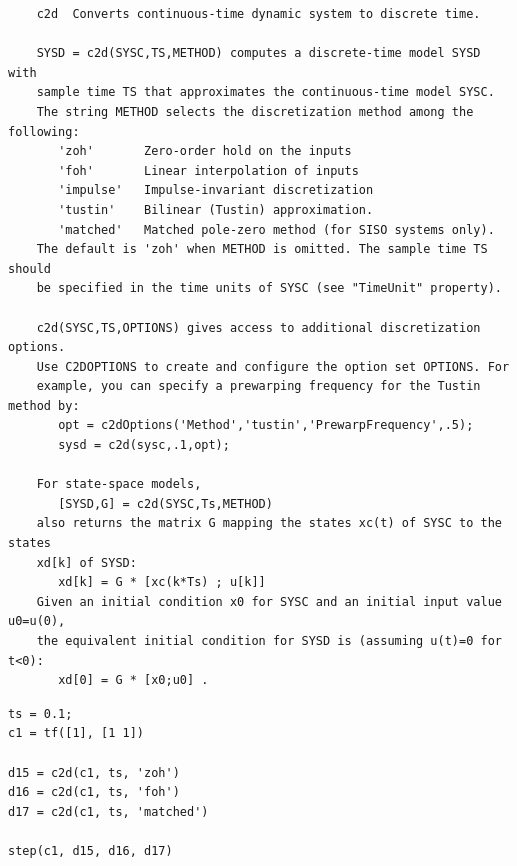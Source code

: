 \documentclass[a4paper, 12pt]{article}
\begin{document}
\begin{lstlisting}
	c2d  Converts continuous-time dynamic system to discrete time.
 
    SYSD = c2d(SYSC,TS,METHOD) computes a discrete-time model SYSD with 
    sample time TS that approximates the continuous-time model SYSC.
    The string METHOD selects the discretization method among the following:
       'zoh'       Zero-order hold on the inputs
       'foh'       Linear interpolation of inputs
       'impulse'   Impulse-invariant discretization
       'tustin'    Bilinear (Tustin) approximation.
       'matched'   Matched pole-zero method (for SISO systems only).
    The default is 'zoh' when METHOD is omitted. The sample time TS should 
    be specified in the time units of SYSC (see "TimeUnit" property).
 
    c2d(SYSC,TS,OPTIONS) gives access to additional discretization options. 
    Use C2DOPTIONS to create and configure the option set OPTIONS. For 
    example, you can specify a prewarping frequency for the Tustin method by:
       opt = c2dOptions('Method','tustin','PrewarpFrequency',.5);
       sysd = c2d(sysc,.1,opt);
 
    For state-space models,
       [SYSD,G] = c2d(SYSC,Ts,METHOD)
    also returns the matrix G mapping the states xc(t) of SYSC to the states 
    xd[k] of SYSD:
       xd[k] = G * [xc(k*Ts) ; u[k]]
    Given an initial condition x0 for SYSC and an initial input value u0=u(0), 
    the equivalent initial condition for SYSD is (assuming u(t)=0 for t<0):
       xd[0] = G * [x0;u0] .
\end{lstlisting}

\begin{table}[!h]
\centering
{}
\end{table}

\begin{lstlisting}
ts = 0.1;
c1 = tf([1], [1 1])

d15 = c2d(c1, ts, 'zoh')
d16 = c2d(c1, ts, 'foh')
d17 = c2d(c1, ts, 'matched')

step(c1, d15, d16, d17)
\end{lstlisting}
\end{document}
